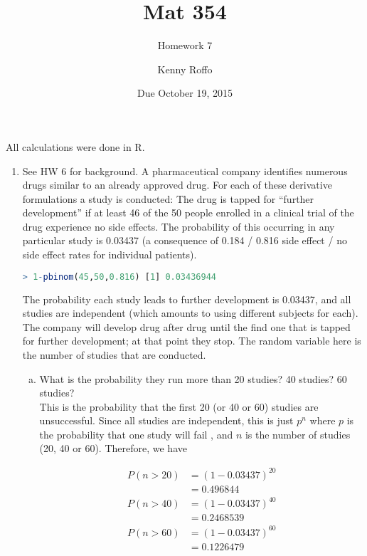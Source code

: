\documentclass{scrartcl}
\title{Mat 354}
\subtitle{Homework 7}
\author{Kenny Roffo}
\date{Due October 19, 2015}
\begin{document}
\maketitle

All calculations were done in R.

\begin{enumerate}

\item See HW 6 for background. A pharmaceutical company identifies numerous drugs similar to an already approved drug. For each of these derivative formulations a study is conducted: The drug is tapped for “further development” if at least 46 of the 50 people enrolled in a clinical trial of the drug experience no side effects. The probability of this occurring in any particular study is 0.03437 (a consequence of 0.184 / 0.816 side effect / no side effect rates for individual patients).

  \begin{lstlisting}[language=R]
    > 1-pbinom(45,50,0.816) [1] 0.03436944
  \end{lstlisting}

The probability each study leads to further development is 0.03437, and all studies are independent (which amounts to using different subjects for each). The company will develop drug after drug until the find one that is tapped for further development; at that point they stop. The random variable here is the number of studies that are conducted.

\begin{enumerate}[a)]
  \item What is the probability they run more than 20 studies? 40 studies? 60 studies?\\

    This is the probability that the first 20 (or 40 or 60) studies are unsuccessful. Since all studies are independent, this is just $p^n$ where $p$ is the probability that one study will fail , and $n$ is the number of studies (20, 40 or 60). Therefore, we have

\begin{align*}
  P(n>20) &= (1 - 0.03437)^{20}\\
  &= 0.496844\\
  P(n>40) &= (1 - 0.03437)^{40}\\
  &= 0.2468539\\
  P(n>60) &= (1 - 0.03437)^{60}\\
  &= 0.1226479
\end{align*}


\end{enumerate}
\end{enumerate}
\end{document}
